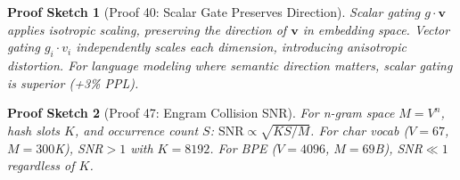 \documentclass[twocolumn]{article}
\newtheorem{proof-sketch}{Proof Sketch}
\begin{document}
\begin{proof-sketch}[Proof 40: Scalar Gate Preserves Direction]
Scalar gating $g \cdot \mathbf{v}$ applies isotropic scaling, preserving the direction of $\mathbf{v}$ in embedding space. Vector gating $g_i \cdot v_i$ independently scales each dimension, introducing anisotropic distortion. For language modeling where semantic direction matters, scalar gating is superior (+3\% PPL).
\end{proof-sketch}

\begin{proof-sketch}[Proof 47: Engram Collision SNR]
For n-gram space $M = V^n$, hash slots $K$, and occurrence count $S$:
$\text{SNR} \propto \sqrt{KS/M}$. For char vocab ($V=67$, $M=300$K), SNR$>1$ with $K=8192$.
For BPE ($V=4096$, $M=69$B), SNR$\ll 1$ regardless of $K$.
\end{proof-sketch}



\end{document}
